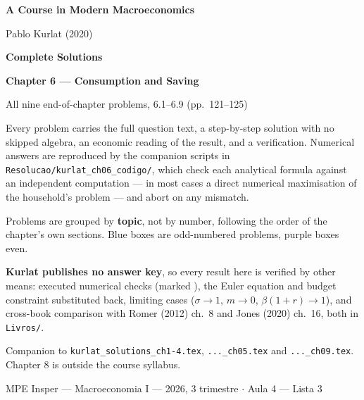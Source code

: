 \documentclass[12pt, letterpaper]{article}
\begin{document}
\begin{titlepage}
\centering
\vspace*{2.5cm}
{\Huge\bfseries\color{darkblue} A Course in Modern Macroeconomics\par}
\vspace{6pt}
{\large Pablo Kurlat (2020)\par}
\vspace{1.4cm}
{\LARGE\bfseries Complete Solutions\par}
\vspace{6pt}
{\LARGE\bfseries Chapter 6 --- Consumption and Saving\par}
\vspace{1.2cm}
{\large All nine end-of-chapter problems, 6.1--6.9 (pp.~121--125)\par}
\vspace{2cm}

\begin{tcolorbox}[theorybox,title={What is in this file},width=0.86\textwidth]
\small
Every problem carries the full question text, a step-by-step solution with no skipped
algebra, an economic reading of the result, and a verification. Numerical answers are
reproduced by the companion scripts in \texttt{Resolucao/kurlat\_ch06\_codigo/}, which
check each analytical formula against an independent computation --- in most cases a direct
numerical maximisation of the household's problem --- and abort on any mismatch.

\smallskip
Problems are grouped by \textbf{topic}, not by number, following the order of the
chapter's own sections. Blue boxes are odd-numbered problems, purple boxes even.

\smallskip
\textbf{Kurlat publishes no answer key}, so every result here is verified by other means:
executed numerical checks (marked \checkmark), the Euler equation and budget constraint
substituted back, limiting cases ($\sigma\to1$, $m\to0$, $\beta(1+r)\to1$), and cross-book
comparison with Romer (2012) ch.~8 and Jones (2020) ch.~16, both in \texttt{Livros/}.

\smallskip
Companion to \texttt{kurlat\_solutions\_ch1-4.tex}, \texttt{...\_ch05.tex} and
\texttt{...\_ch09.tex}. Chapter 8 is outside the course syllabus.
\end{tcolorbox}

\vfill
{\small MPE Insper --- Macroeconomia I --- 2026, 3\textordmasculine{} trimestre \quad$\cdot$\quad
Aula 4 --- Lista 3\par}
\end{titlepage}
\end{document}
